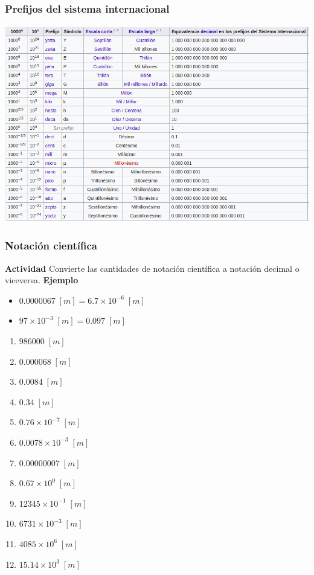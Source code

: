 \documentclass[11pt]{article}
\theoremstyle{definition}
\begin{document}
\subsubsection{Prefijos del sistema internacional}

\includegraphics[scale=0.5]{img/prefijos.png}

\subsubsection{Notación científica}

\begin{myblock}{\textbf{Actividad }}
	Convierte las cantidades de notación científica a notación decimal o viceversa. 
	\textbf{Ejemplo}
	\begin{itemize}
		\item $0.0000067 \;[m] = 6.7 \times 10^{-6} \;[m] $
		\item $97 \times 10^{-3} \;[m] = 0.097 \;[m]$
	\end{itemize}

	
    
    \begin{multicols}{2} 
        \begin{enumerate}
            \item $986000 \;[m] $
            \item $0.000068 \;[m] $
            \item $0.0084 \;[m] $
            \item $0.34 \;[m] $
            \item $0.76 \times 10^{-7} \;[m] $
            \item $0.0078 \times 10^{-3} \;[m] $
            \item $0.00000007 \;[m] $
            \item $0.67 \times 10^{0}\;[m] $
            \item $12345 \times 10^{-1} \;[m] $
            \item $6731 \times 10^{-3}\;[m] $
            \item $4085 \times 10^{6} \;[m] $
            \item $15.14 \times 10^{3}\;[m] $
        \end{enumerate}
    \end{multicols}
\end{myblock}
\end{document}
